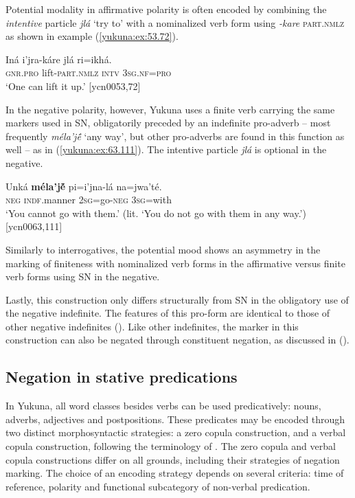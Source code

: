 \documentclass[output=paper,colorlinks,citecolor=brown]{langscibook}
\begin{document}
Potential modality in affirmative polarity is often encoded by combining the \textit{intentive} particle \textit{jlá} ‘try to’ with a nominalized verb form using \textit{-kare} \textsc{part.nmlz} as shown in example (\ref{yukuna:ex:53.72}). 

\ea\label{yukuna:ex:53.72}
\gll Iná i'jra-káre jlá ri=ikhá. \\
\textsc{gnr.pro} lift-\textsc{part.nmlz} \textsc{intv} \textsc{3sg.nf}=\textsc{pro}  \\
\glt ‘One can lift it up.’ [ycn0053,72]
\z

In the negative polarity, however, Yukuna uses a finite verb carrying the same markers used in SN, obligatorily preceded by an indefinite pro-adverb – most frequently \textit{méla'jẽ́} ‘any way’, but other pro-adverbs are found in this function as well – as in (\ref{yukuna:ex:63.111}). The intentive particle \textit{jlá} is optional in the negative. 

\ea\label{yukuna:ex:63.111}
\gll Unká \textbf{méla'jẽ́} pi=i'jna-lá na=jwa'té. \\ 
\textsc{neg} \textsc{indf}.manner \textsc{2sg}=go-\textsc{neg} \textsc{3sg}=with  \\
\glt ‘You cannot go with them.’ (lit. ‘You do not go with them in any way.') [ycn0063,111]
\z

Similarly to interrogatives, the potential mood shows an asymmetry in the marking of finiteness with nominalized verb forms in the affirmative versus finite verb forms using SN in the negative.

Lastly, this construction only differs structurally from SN in the obligatory use of the negative indefinite. The features of this pro-form are identical to those of other negative indefinites (). Like other indefinites, the marker in this construction can also be negated through constituent negation, as discussed in ().
 
\subsection{Negation in stative predications}\label{yukuna:negnv}
In Yukuna, all word classes besides verbs can be used predicatively: nouns, adverbs, adjectives and postpositions. These predicates may be encoded through two distinct morphosyntactic strategies: a zero copula construction, and a verbal copula construction, following the terminology of \citet{Stassen1997}. The zero copula and verbal copula constructions differ on all grounds, including their strategies of negation marking. The choice of an encoding strategy depends on several criteria: time of reference, polarity and functional subcategory of non-verbal predication.
\end{document}
